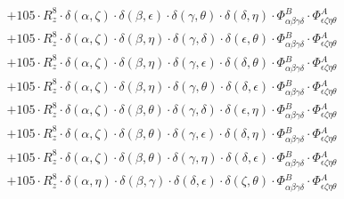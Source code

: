\documentclass{article}
\begin{document}
\begin{equation}
\begin{array}{c}
 \\[0.2em] 		 + 105 \cdot R_{z}^{8} \cdot \delta{}\left(\alpha{}, \zeta{}\right) \cdot \delta{}\left(\beta{}, \epsilon{}\right) \cdot \delta{}\left(\gamma{}, \theta{}\right) \cdot \delta{}\left(\delta{}, \eta{}\right) \cdot \Phi{}^{B}_{\alpha{}\beta{}\gamma{}\delta{}} \cdot \Phi{}^{A}_{\epsilon{}\zeta{}\eta{}\theta{}} 
 \\[0.2em] 		 + 105 \cdot R_{z}^{8} \cdot \delta{}\left(\alpha{}, \zeta{}\right) \cdot \delta{}\left(\beta{}, \eta{}\right) \cdot \delta{}\left(\gamma{}, \delta{}\right) \cdot \delta{}\left(\epsilon{}, \theta{}\right) \cdot \Phi{}^{B}_{\alpha{}\beta{}\gamma{}\delta{}} \cdot \Phi{}^{A}_{\epsilon{}\zeta{}\eta{}\theta{}} 
 \\[0.2em] 		 + 105 \cdot R_{z}^{8} \cdot \delta{}\left(\alpha{}, \zeta{}\right) \cdot \delta{}\left(\beta{}, \eta{}\right) \cdot \delta{}\left(\gamma{}, \epsilon{}\right) \cdot \delta{}\left(\delta{}, \theta{}\right) \cdot \Phi{}^{B}_{\alpha{}\beta{}\gamma{}\delta{}} \cdot \Phi{}^{A}_{\epsilon{}\zeta{}\eta{}\theta{}} 
 \\[0.2em] 		 + 105 \cdot R_{z}^{8} \cdot \delta{}\left(\alpha{}, \zeta{}\right) \cdot \delta{}\left(\beta{}, \eta{}\right) \cdot \delta{}\left(\gamma{}, \theta{}\right) \cdot \delta{}\left(\delta{}, \epsilon{}\right) \cdot \Phi{}^{B}_{\alpha{}\beta{}\gamma{}\delta{}} \cdot \Phi{}^{A}_{\epsilon{}\zeta{}\eta{}\theta{}} 
 \\[0.2em] 		 + 105 \cdot R_{z}^{8} \cdot \delta{}\left(\alpha{}, \zeta{}\right) \cdot \delta{}\left(\beta{}, \theta{}\right) \cdot \delta{}\left(\gamma{}, \delta{}\right) \cdot \delta{}\left(\epsilon{}, \eta{}\right) \cdot \Phi{}^{B}_{\alpha{}\beta{}\gamma{}\delta{}} \cdot \Phi{}^{A}_{\epsilon{}\zeta{}\eta{}\theta{}} 
 \\[0.2em] 		 + 105 \cdot R_{z}^{8} \cdot \delta{}\left(\alpha{}, \zeta{}\right) \cdot \delta{}\left(\beta{}, \theta{}\right) \cdot \delta{}\left(\gamma{}, \epsilon{}\right) \cdot \delta{}\left(\delta{}, \eta{}\right) \cdot \Phi{}^{B}_{\alpha{}\beta{}\gamma{}\delta{}} \cdot \Phi{}^{A}_{\epsilon{}\zeta{}\eta{}\theta{}} 
 \\[0.2em] 		 + 105 \cdot R_{z}^{8} \cdot \delta{}\left(\alpha{}, \zeta{}\right) \cdot \delta{}\left(\beta{}, \theta{}\right) \cdot \delta{}\left(\gamma{}, \eta{}\right) \cdot \delta{}\left(\delta{}, \epsilon{}\right) \cdot \Phi{}^{B}_{\alpha{}\beta{}\gamma{}\delta{}} \cdot \Phi{}^{A}_{\epsilon{}\zeta{}\eta{}\theta{}} 
 \\[0.2em] 		 + 105 \cdot R_{z}^{8} \cdot \delta{}\left(\alpha{}, \eta{}\right) \cdot \delta{}\left(\beta{}, \gamma{}\right) \cdot \delta{}\left(\delta{}, \epsilon{}\right) \cdot \delta{}\left(\zeta{}, \theta{}\right) \cdot \Phi{}^{B}_{\alpha{}\beta{}\gamma{}\delta{}} \cdot \Phi{}^{A}_{\epsilon{}\zeta{}\eta{}\theta{}} 

\end{array}
\end{equation}
\end{document}
